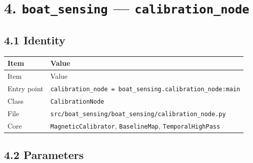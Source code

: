 \section{4. \texttt{boat\_sensing} --- \texttt{calibration\_node}}


\subsection{4.1 Identity}


\begin{center}
\small
\begin{longtable}{@{}lp{10cm}@{}}
\toprule
Item & Value \\
\midrule
\endfirsthead
\toprule
Item & Value \\
\midrule
\endhead
Entry point & \texttt{calibration\_node = boat\_sensing.calibration\_node:main} \\
Class & \texttt{CalibrationNode} \\
File & \texttt{src/boat\_sensing/boat\_sensing/calibration\_node.py} \\
Core & \texttt{MagneticCalibrator}, \texttt{BaselineMap}, \texttt{TemporalHighPass} \\
\bottomrule
\end{longtable}
\end{center}


\subsection{4.2 Parameters}


